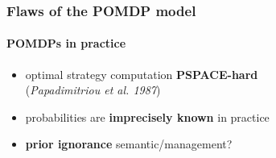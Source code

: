 \documentclass[12pt,svgnames,table]{beamer}
\begin{document}
\begin{frame}
\frametitle{Flaws of the POMDP model}
\framesubtitle{\footnotesize POMDPs in practice}
\begin{itemize}
\item optimal strategy computation \textbf{PSPACE-hard}\\
{ \footnotesize \hspace{4cm}(\textit{Papadimitriou et al. 1987})}
\end{itemize}
\vspace{0.6cm}
\begin{itemize}
\item probabilities are \textbf{imprecisely known} in practice
\end{itemize}
\vspace{1.2cm}
\begin{itemize}
\item \textbf{prior ignorance} semantic/management?
\end{itemize}
\end{frame}
\end{document}
